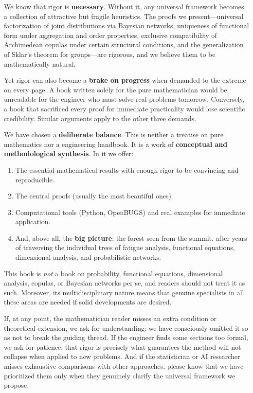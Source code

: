 We know that rigor is \textbf{necessary}. Without it, any universal framework becomes a collection of attractive but fragile heuristics. The proofs we present---universal factorization of joint distributions via Bayesian networks, uniqueness of functional form under aggregation and order properties, exclusive compatibility of Archimedean copulas under certain structural conditions, and the generalization of Sklar's theorem for groups---are rigorous, and we believe them to be mathematically natural.

Yet rigor can also become a \textbf{brake on progress} when demanded to the extreme on every page. A book written solely for the pure mathematician would be unreadable for the engineer who must solve real problems tomorrow. Conversely, a book that sacrificed every proof for immediate practicality would lose scientific credibility. Similar arguments apply to the other three demands.

We have chosen a \textbf{deliberate balance}. This is neither a treatise on pure mathematics nor a engineering handbook. It is a work of \textbf{conceptual and methodological synthesis}. In it we offer:

\begin{enumerate}
\item The essential mathematical results with enough rigor to be convincing and reproducible.
\item The central proofs (usually the most beautiful ones).
\item Computational tools (Python, OpenBUGS) and real examples for immediate application.
\item And, above all, the \textbf{big picture}: the forest seen from the summit, after years of traversing the individual trees of fatigue analysis, functional equations, dimensional analysis, and probabilistic networks.
\end{enumerate}

This book is \textit{not} a book on probability, functional equations, dimensional analysis, copulas, or Bayesian networks per se, and readers should not treat it as such. Moreover, its multidisciplinary nature means that genuine specialists in all these areas are needed if solid developments are desired.

If, at any point, the mathematician reader misses an extra condition or theoretical extension, we ask for understanding: we have consciously omitted it so as not to break the guiding thread. If the engineer finds some sections too formal, we ask for patience: that rigor is precisely what guarantees the method will not collapse when applied to new problems. And if the statistician or AI researcher misses exhaustive comparisons with other approaches, please know that we have prioritized them only when they genuinely clarify the universal framework we propose.

